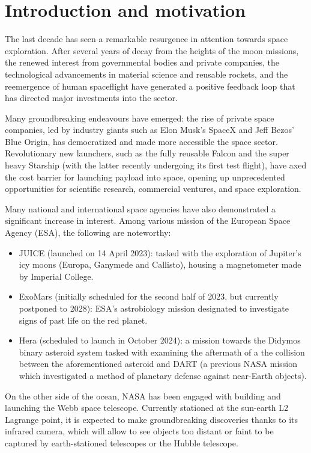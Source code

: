 \section{Introduction and motivation}
\label{1}
The last decade has seen a remarkable resurgence in attention towards space exploration. After several years of decay from the heights of the moon missions, the renewed interest from governmental bodies and private companies, the technological advancements in material science and reusable rockets, and the reemergence of human spaceflight have generated a positive feedback loop that has directed major investments into the sector.

Many groundbreaking endeavours have emerged: the rise of private space companies, led by industry giants such as Elon Musk's SpaceX and Jeff Bezos' Blue Origin, has democratized and made more accessible the space sector. Revolutionary new launchers, such as the fully reusable Falcon and the super heavy Starship (with the latter recently undergoing its first test flight), have axed the cost barrier for launching payload into space, opening up unprecedented opportunities for scientific research, commercial ventures, and space exploration.

Many national and international space agencies have also demonstrated a significant increase in interest. Among various mission of the European Space Agency (ESA), the following are noteworthy:

\begin{itemize}
    \item JUICE (launched on 14 April 2023): tasked with the exploration of Jupiter's icy moons (Europa, Ganymede and Callisto), housing a magnetometer made by Imperial College.
    \item ExoMars (initially scheduled for the second half of 2023, but currently postponed to 2028): ESA's astrobiology mission designated to investigate signs of past life on the red planet.
    \item Hera (scheduled to launch in October 2024): a mission towards the Didymos binary asteroid system tasked with examining the aftermath of a the collision between the aforementioned asteroid and DART (a previous NASA mission which investigated a method of planetary defense against near-Earth objects).
\end{itemize}

On the other side of the ocean, NASA has been engaged with building and launching the Webb space telescope.  Currently stationed at the sun-earth L2 Lagrange point, it is expected to make groundbreaking discoveries thanks to its infrared camera, which will allow to see objects too distant or faint to be captured by earth-stationed telescopes or the Hubble telescope.

